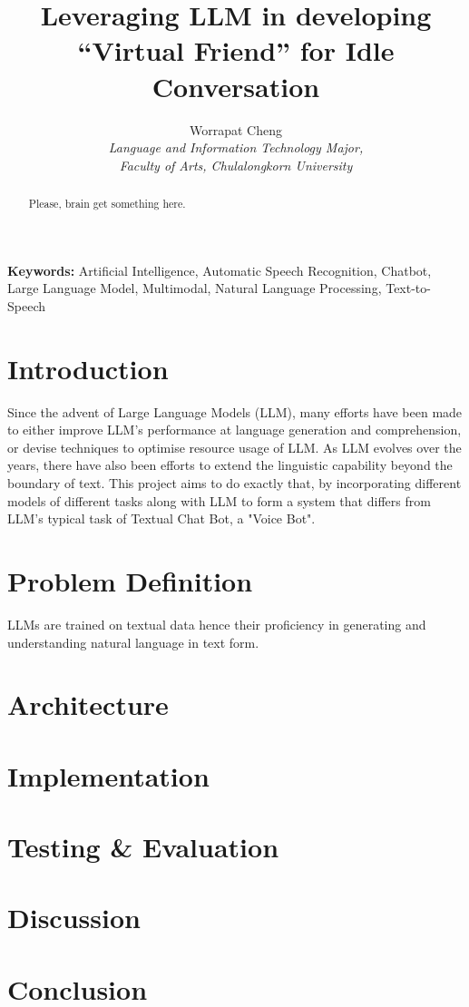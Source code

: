 \documentclass{article}
\title{Leveraging LLM in developing “Virtual Friend” for Idle Conversation}
\author{Worrapat Cheng \\ \textit{\small Language and Information Technology Major,} \\ \textit{\small Faculty of Arts,  Chulalongkorn University}}
\date{}
\begin{document}
\maketitle

\begin{center}
\begin{abstract}
    Please, brain get something here.
\end{abstract}
\end{center}

\small \textbf{Keywords: } Artificial Intelligence, Automatic Speech Recognition, Chatbot, Large Language Model, Multimodal, Natural Language Processing, Text-to-Speech

\normalsize

\section{Introduction}

Since the advent of Large Language Models (LLM), many efforts have been made to either improve LLM's performance at language generation and comprehension, or devise techniques to optimise resource usage of LLM. As LLM evolves over the years, there have also been efforts to extend the linguistic capability beyond the boundary of text. This project aims to do exactly that, by incorporating different models of different tasks along with LLM to form a system that differs from LLM's typical task of Textual Chat Bot, a "Voice Bot".

\section{Problem Definition}

LLMs are trained on textual data hence their proficiency in generating and understanding natural language in text form. 

\section{Architecture}

\section{Implementation}

\section{Testing \& Evaluation}

\section{Discussion}

\section{Conclusion}
\end{document}
